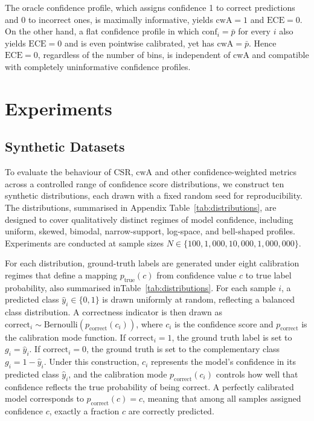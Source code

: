 \documentclass{article}
\theoremstyle{plain}
\theoremstyle{definition}
\theoremstyle{remark}
\begin{document}
The oracle confidence profile, which assigns confidence 1 to correct predictions and 0 to incorrect ones, is maximally informative, yields $\mathrm{cwA} = 1$ and $\mathrm{ECE} = 0$. On the other hand, a flat confidence profile in which $\mathrm{conf}_i = \bar{p}$ for every $i$ also yields $\mathrm{ECE} = 0$ and is even pointwise calibrated, yet has $\mathrm{cwA} = \bar{p}$. Hence $\mathrm{ECE} = 0$, regardless of the number of bins, is independent of cwA and compatible with completely uninformative confidence profiles. 


\section{Experiments}

\subsection{Synthetic Datasets}

To evaluate the behaviour of  $\mathrm{CSR}$,  $\mathrm{cwA}$ and other confidence-weighted metrics across a controlled range of confidence score distributions, we construct ten synthetic distributions, each drawn with a fixed random seed for reproducibility. The distributions, summarised in Appendix Table~\ref{tab:distributions}, are designed to cover qualitatively distinct regimes of model confidence, including uniform, skewed, bimodal, narrow-support, log-space, and bell-shaped profiles. Experiments are conducted at sample sizes $N \in \{100, 1{,}000, 10{,}000, 1{,}000{,}000\}$.

For each distribution, ground-truth labels are generated under eight calibration regimes that define a mapping $p_{\text{true}}(c)$ from confidence value $c$ to true label probability, also summarised inTable~\ref{tab:distributions}. For each sample $i$, a predicted class $\hat{y}_i \in \{0, 1\}$ is drawn uniformly at random, reflecting a balanced class distribution. A correctness indicator is then drawn as $\text{correct}_i \sim \text{Bernoulli}(p_{\text{correct}}(c_i))$, where $c_i$ is the confidence score and $p_{\text{correct}}$ is the calibration mode function. If $\text{correct}_i = 1$, the ground truth label is set to $g_i = \hat{y}_i$. If $\text{correct}_i = 0$, the ground truth is set to the complementary class $g_i = 1 - \hat{y}_i$. Under this construction, $c_i$ represents the model's confidence in its predicted class $\hat{y}_i$, and the calibration mode $p_{\text{correct}}(c_i)$ controls how well that confidence reflects the true probability of being correct. A perfectly calibrated model corresponds to $p_{\text{correct}}(c) = c$, meaning that among all samples assigned confidence $c$, exactly a fraction $c$ are correctly predicted.
\end{document}
